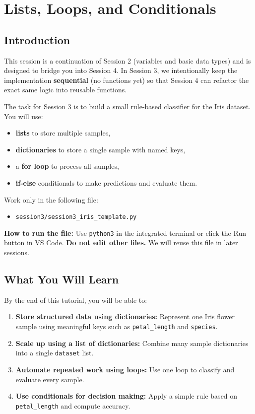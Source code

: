 \chapter{Lists, Loops, and Conditionals}

\section{Introduction}
This session is a continuation of Session 2 (variables and basic data types) and is designed to bridge you into Session 4.
In Session 3, we intentionally keep the implementation \textbf{sequential} (no functions yet) so that Session 4 can refactor the exact same logic into reusable functions.

The task for Session 3 is to build a small rule-based classifier for the Iris dataset. You will use:
\begin{itemize}
    \item \textbf{lists} to store multiple samples,
    \item \textbf{dictionaries} to store a single sample with named keys,
    \item a \textbf{for loop} to process all samples,
    \item \textbf{if-else} conditionals to make predictions and evaluate them.
\end{itemize}

\begin{tcolorbox}[title=Hands-on file for this session]
Work only in the following file:
\begin{itemize}
    \item \texttt{session3/session3\_iris\_template.py}
\end{itemize}
\textbf{How to run the file:} Use \texttt{python3} in the integrated terminal or click the Run button in VS Code. \textbf{Do not edit other files.} We will reuse this file in later sessions.
\end{tcolorbox}

\section{What You Will Learn}
By the end of this tutorial, you will be able to:
\begin{enumerate}
    \item \textbf{Store structured data using dictionaries:} Represent one Iris flower sample using meaningful keys such as \texttt{petal\_length} and \texttt{species}.
    \item \textbf{Scale up using a list of dictionaries:} Combine many sample dictionaries into a single \texttt{dataset} list.
    \item \textbf{Automate repeated work using loops:} Use one loop to classify and evaluate every sample.
    \item \textbf{Use conditionals for decision making:} Apply a simple rule based on \texttt{petal\_length} and compute accuracy.
\end{enumerate}



